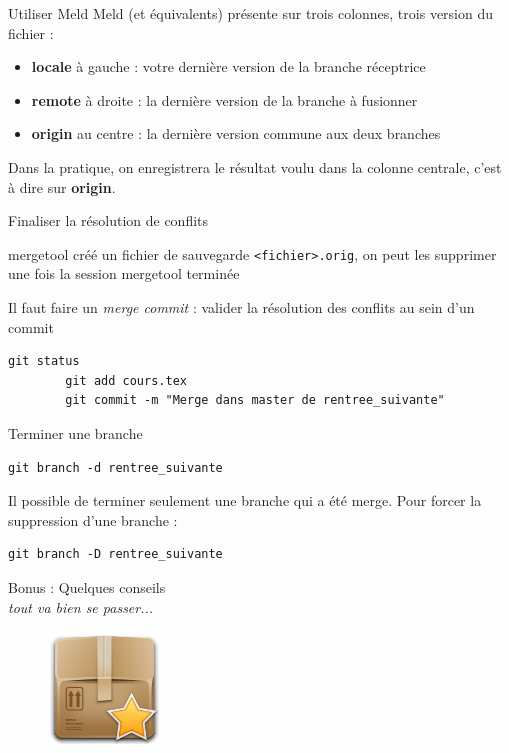 \documentclass{beamer}
\begin{document}
\begin{frame}{Utiliser Meld}
	Meld (et équivalents) présente sur trois colonnes, trois version du fichier :
	\begin{itemize}
		\item \textbf{locale} à gauche : votre dernière version de la branche réceptrice
		\item \textbf{remote} à droite : la dernière version de la branche à fusionner
		\item \textbf{origin} au centre : la dernière version commune aux deux branches
	\end{itemize}
	
	Dans la pratique, on enregistrera le résultat voulu dans la colonne centrale, c'est à dire sur \textbf{origin}.
\end{frame}

\begin{frame}[fragile]{Finaliser la résolution de conflits}

	mergetool créé un fichier de sauvegarde \texttt{<fichier>.orig}, on peut les supprimer une fois la session mergetool terminée
	\vfill{}
	
	Il faut faire un \textit{merge commit} : valider la résolution des conflits au sein d'un commit
	\begin{lstlisting}[frame=single]
		git status
		git add cours.tex
		git commit -m "Merge dans master de rentree_suivante"
	\end{lstlisting}	
\end{frame}

\begin{frame}[fragile]{Terminer une branche}

	\begin{lstlisting}[frame=single]
		git branch -d rentree_suivante
	\end{lstlisting}
	\vfill{}
	Il possible de terminer seulement une branche qui a été merge.
	Pour forcer la suppression d'une branche :
	\begin{lstlisting}[frame=single]
		git branch -D rentree_suivante
	\end{lstlisting}
	
\end{frame}

\begin{frame}
	\begin{center}
 		\Large{Bonus : Quelques conseils}\\
 		{\small  \textit{tout va bien se passer...}}
	\end{center}

	\begin{figure}
		\centering
		\includegraphics[height=3cm]{img/bonus}
	\end{figure}
\end{frame}
\end{document}
